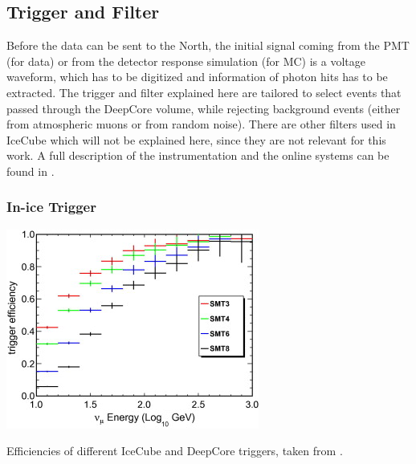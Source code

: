 \subsection{Trigger and Filter} 

Before the data can be sent to the North, the initial signal coming from the PMT (for data) or from the detector response simulation (for MC) is a voltage waveform, which has to be digitized and information of photon hits has to be extracted. The trigger and filter explained here are tailored to select events that passed through the DeepCore volume, while rejecting background events (either from atmospheric muons or from random noise). There are other filters used in IceCube which will not be explained here, since they are not relevant for this work. A full description of the instrumentation and the online systems can be found in .


\subsubsection{In-ice Trigger} 

\begin{marginfigure}
    \includegraphics{figures/simulation_and_processing/trigger/trigger_efficiency.jpg}
	\caption[IceCube trigger efficiencies]{Efficiencies of different IceCube and DeepCore triggers, taken from \cite{DeepCore_design_Abbasi2012615}.}
\end{marginfigure}


